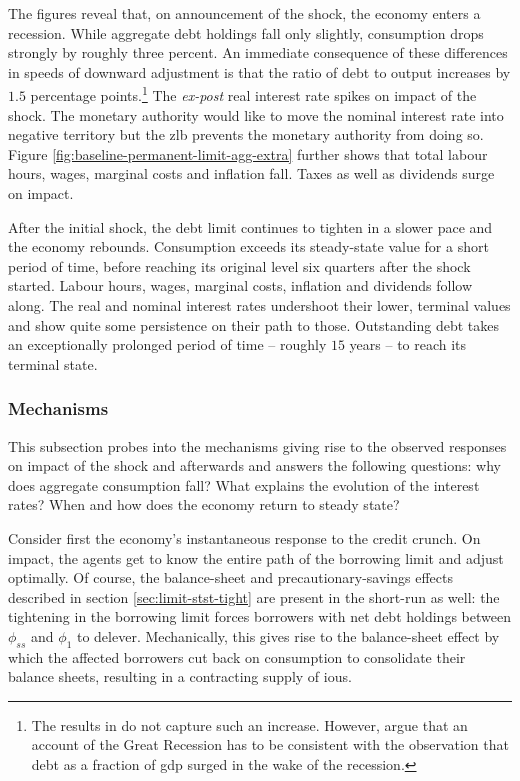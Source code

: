 \documentclass[12pt]{article} %
\numberwithin{equation}{section} %
\numberwithin{figure}{section}
\numberwithin{table}{section}
\begin{document}
The figures reveal that, on announcement of the shock, the economy enters a recession. While aggregate debt holdings fall only slightly, consumption drops strongly by roughly three percent. An immediate consequence of these differences in speeds of downward adjustment is that the ratio of debt to output increases by $1.5$ percentage points.\footnote{The results in \textcite{gl2017} do not capture such an increase. However, \textcite{justiniano2015} argue that an account of the Great Recession has to be consistent with the observation that debt as a fraction of \Gls{gdp} surged in the wake of the recession.} The \textit{ex-post} real interest rate spikes on impact of the shock. The monetary authority would like to move the nominal interest rate into negative territory but the \Gls{zlb} prevents the monetary authority from doing so. Figure \ref{fig:baseline-permanent-limit-agg-extra} further shows that total labour hours, wages, marginal costs and inflation fall. Taxes as well as dividends surge on impact. %

After the initial shock, the debt limit continues to tighten in a slower pace and the economy rebounds. Consumption exceeds its steady-state value for a short period of time, before reaching its original level six quarters after the shock started. Labour hours, wages, marginal costs, inflation and dividends follow along. The real and nominal interest rates undershoot their lower, terminal values and show quite some persistence on their path to those. Outstanding debt takes an exceptionally prolonged period of time -- roughly $15$ years -- to reach its terminal state. 

\subsubsection{Mechanisms}
\label{sec:limit-transition-mechanisms}

This subsection probes into the mechanisms giving rise to the observed responses on impact of the shock and afterwards and answers the following questions: why does aggregate consumption fall? What explains the evolution of the interest rates? When and how does the economy return to steady state?

Consider first the economy's instantaneous response to the credit crunch. On impact, the agents get to know the entire path of the borrowing limit and adjust optimally. Of course, the balance-sheet and precautionary-savings effects described in section \ref{sec:limit-stst-tight} are present in the short-run as well: the tightening in the borrowing limit forces borrowers with net debt holdings between $\phi_{ss}$ and $\phi_1$ to delever. Mechanically, this gives rise to the balance-sheet effect by which the affected borrowers cut back on consumption to consolidate their balance sheets, resulting in a contracting supply of \Gls{iou}s. 
\end{document}
